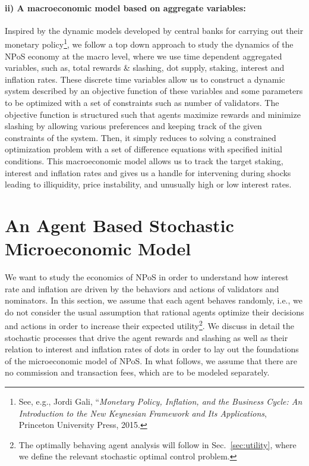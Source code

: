 \documentclass[a4,11pt]{paper}
\begin{document}
\paragraph{ii) A macroeconomic model based on aggregate variables:}
Inspired by the dynamic models developed by central banks for carrying out their monetary policy\footnote{See, e.g., Jordi Gali, ``{\it Monetary Policy, Inflation, and the Business Cycle: An Introduction to the New Keynesian Framework and Its Applications}, Princeton University Press, 2015.}, 
we follow a top down approach to study the dynamics of the NPoS economy at the macro level, where we use time dependent aggregated variables, such as, total rewards \& slashing, dot supply, staking, interest and inflation rates. These discrete time variables allow us to construct a dynamic system described by an objective function of these variables and some parameters to be optimized with a set of constraints such as number of validators. The objective function is structured such that agents maximize rewards and minimize slashing by allowing various preferences and keeping track of the given constraints of the system. Then, it simply reduces to solving a constrained optimization problem with a set of difference equations with specified initial conditions. This macroeconomic model allows us to track the target staking, interest and inflation rates and gives us a handle for intervening during shocks leading to illiquidity, price instability, and unusually high or low interest rates.


\newpage
\section{An Agent Based Stochastic Microeconomic Model}
\label{sec:micro}

We want to study the economics of NPoS in order to understand how interest rate and inflation are driven by the behaviors and actions of validators and nominators. 
In this section, we assume that each agent behaves randomly, i.e., we do not consider the usual assumption that rational agents optimize their decisions and actions in order to increase their expected utility\footnote{The optimally behaving agent analysis will follow in Sec.~\ref{sec:utility}, where we define the relevant stochastic optimal control problem.}. 
We discuss in detail the stochastic processes that drive the agent rewards and slashing as well as their relation to interest and inflation rates of dots in order to lay out the foundations of the microeconomic model of NPoS. In what follows, we assume that there are no commission and transaction fees, which are to be modeled separately. 
\end{document}
